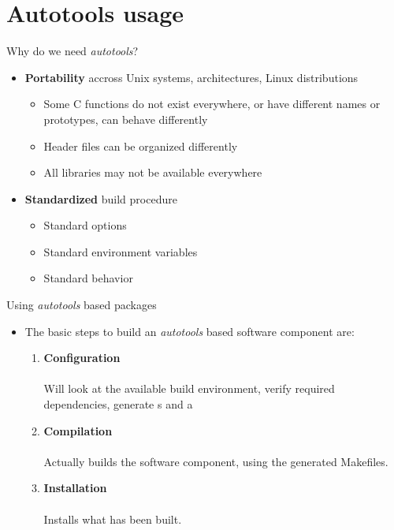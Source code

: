 \section{Autotools usage}

\begin{frame}{Why do we need {\em autotools}?}
  \begin{itemize}
  \item {\bf Portability} accross Unix systems, architectures, Linux
    distributions
    \begin{itemize}
    \item Some C functions do not exist everywhere, or have different
      names or prototypes, can behave differently
    \item Header files can be organized differently
    \item All libraries may not be available everywhere
    \end{itemize}
  \item {\bf Standardized} build procedure
    \begin{itemize}
    \item Standard options
    \item Standard environment variables
    \item Standard behavior
    \end{itemize}
  \end{itemize}
\end{frame}

\begin{frame}{Using {\em autotools} based packages}
  \begin{itemize}
  \item The basic steps to build an {\em autotools} based software
    component are:
    \begin{enumerate}
    \item {\bf Configuration}\\
      \\
      Will look at the available build environment, verify required
      dependencies, generate s and a 
    \item {\bf Compilation}\\
      \\
      Actually builds the software component, using the generated
      Makefiles.
    \item {\bf Installation}\\
      \\
      Installs what has been built.
    \end{enumerate}
  \end{itemize}
\end{frame}


